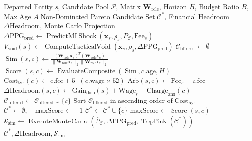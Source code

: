 \documentclass[10pt,journal,compsoc]{IEEEtran}
\begin{document}
\begin{algorithm}[t]
\caption{Dual-Engine Tactical Replacement \& Regulatory Arbitrage Optimization}
\label{alg:master}
\begin{algorithmic}[1]
\REQUIRE Departed Entity $s$, Candidate Pool $\mathcal{P}$, Matrix $\mathbf{W}_{\mathrm{role}}$, Horizon $H$, Budget Ratio $B$, Max Age $A$
\ENSURE Non-Dominated Pareto Candidate Set $\mathcal{C}^*$, Financial Headroom $\Delta\mathrm{Headroom}$, Monte Carlo Projection
\STATE $\Delta\mathrm{PPG}_{\mathrm{pred}} \leftarrow \operatorname{PredictMLShock}(\mathbf{x}_s, \rho_s, \bar{P}_{\mathcal{C}}, \mathrm{Fee}_s)$
\STATE $V_{\mathrm{void}}(s) \leftarrow \operatorname{ComputeTacticalVoid}(\mathbf{x}_s, \rho_s, \Delta\mathrm{PPG}_{\mathrm{pred}})$
\STATE $\mathcal{C}_{\mathrm{filtered}} \leftarrow \emptyset$
        \STATE $\operatorname{Sim}(s, c) \leftarrow \frac{(\mathbf{W}_{\mathrm{role}} \mathbf{x}_s)^T (\mathbf{W}_{\mathrm{role}} \mathbf{x}_c)}{\|\mathbf{W}_{\mathrm{role}} \mathbf{x}_s\|_2 \|\mathbf{W}_{\mathrm{role}} \mathbf{x}_c\|_2}$
        \STATE $\operatorname{Score}(s, c) \leftarrow \operatorname{EvaluateComposite}(\operatorname{Sim}, c.\text{age}, H)$
        \STATE $\mathrm{Cost}_{5\mathrm{yr}}(c) \leftarrow c.\text{fee} + 5 \cdot (c.\text{wage} \times 52)$
        \STATE $\mathrm{Arb}(s, c) \leftarrow \mathrm{Fee}_s - c.\text{fee}$
        \STATE $\Delta\mathrm{Headroom}(s, c) \leftarrow \mathrm{Gain}_{\mathrm{disp}}(s) + \mathrm{Wage}_s - \mathrm{Charge}_{\mathrm{ann}}(c)$
        \STATE $\mathcal{C}_{\mathrm{filtered}} \leftarrow \mathcal{C}_{\mathrm{filtered}} \cup \{c\}$
    \ENDIF
\ENDFOR
\STATE Sort $\mathcal{C}_{\mathrm{filtered}}$ in ascending order of $\mathrm{Cost}_{5\mathrm{yr}}$
\STATE $\mathcal{C}^* \leftarrow \emptyset, \quad \text{maxScore} \leftarrow -1$
        \STATE $\mathcal{C}^* \leftarrow \mathcal{C}^* \cup \{c\}$
        \STATE $\text{maxScore} \leftarrow \operatorname{Score}(s, c)$
    \ENDIF
\ENDFOR
\STATE $\mathcal{S}_{\mathrm{sim}} \leftarrow \operatorname{ExecuteMonteCarlo}(\bar{P}_{\mathcal{C}}, \Delta\mathrm{PPG}_{\mathrm{pred}}, \operatorname{TopPick}(\mathcal{C}^*))$
\RETURN $\mathcal{C}^*, \Delta\mathrm{Headroom}, \mathcal{S}_{\mathrm{sim}}$
\end{algorithmic}
\end{algorithm}
\end{document}
